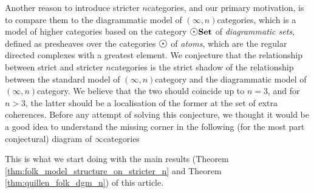 Another reason to introduce stricter \( n \)\nbd categories, and our primary motivation, is to compare them to the diagrammatic model of \( (\infty, n) \)\nbd categories, which is a model of higher categories based on the category \( \dgmSet \) of \emph{diagrammatic sets}, defined as presheaves over the categories \( \atom \) of \emph{atoms}, which are the regular directed complexes with a greatest element.  
We conjecture that the relationship between strict and stricter \( n \)\nbd categories is the strict shadow of the relationship between the standard model of \( (\infty, n) \)\nbd category and the diagrammatic model of \( (\infty, n) \)\nbd category. 
We believe that the two should coincide up to \( n = 3 \), and for \( n > 3 \), the latter should be a localisation of the former at the set of extra coherences.
Before any attempt of solving this conjecture, we thought it would be a good idea to understand the missing corner in the following (for the most part conjectural) diagram of \( \infty \)\nbd categories
\begin{center}
\end{center}
This is what we start doing with the main results (Theorem \ref{thm:folk_model_structure_on_stricter_n} and Theorem \ref{thm:quillen_folk_dgm_n}) of this article.
